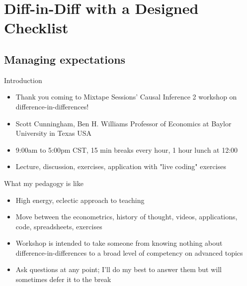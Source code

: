 \documentclass{beamer}
\begin{document}





\section{Diff-in-Diff with a Designed Checklist}


\subsection{Managing expectations}


\begin{frame}{Introduction}

\begin{itemize}
\item Thank you coming to Mixtape Sessions' Causal Inference 2 workshop on difference-in-differences!  
\item Scott Cunningham, Ben H. Williams Professor of Economics at Baylor University in Texas USA
\item 9:00am to 5:00pm CST, 15 min breaks every hour, 1 hour lunch at 12:00
\item Lecture, discussion, exercises, application with "live coding" exercises
\end{itemize}

\end{frame}


\begin{frame}{What my pedagogy is like}

\begin{itemize}
\item High energy, eclectic approach to teaching
\item Move between the econometrics, history of thought, videos, applications, code, spreadsheets, exercises
\item Workshop is intended to take someone from knowing nothing about difference-in-differences to a broad level of competency on advanced topics
\item Ask questions at any point; I'll do my best to answer them but will sometimes defer it to the break
\end{itemize}

\end{frame}
\end{document}
